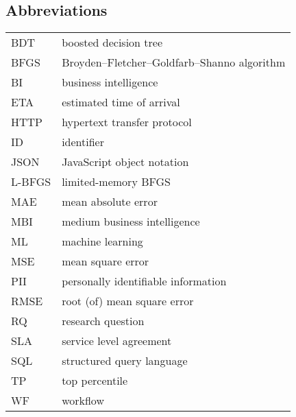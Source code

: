 \subsection*{Abbreviations}

\begin{tabular}{ll}
BDT         & boosted decision tree \\
BFGS        & Broyden–Fletcher–Goldfarb–Shanno algorithm \\
BI          & business intelligence \\
ETA         & estimated time of arrival \\
HTTP        & hypertext transfer protocol \\
ID          & identifier \\
JSON        & JavaScript object notation \\
L-BFGS      & limited-memory BFGS \\
MAE         & mean absolute error \\
MBI         & medium business intelligence \\
ML          & machine learning \\
MSE         & mean square error \\
PII         & personally identifiable information \\
RMSE        & root (of) mean square error \\
RQ          & research question \\
SLA         & service level agreement \\
SQL         & structured query language \\
TP          & top percentile \\
WF          & workflow \\
\end{tabular}

